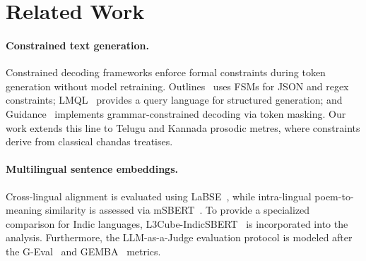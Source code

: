 \documentclass[11pt]{article}
\begin{document}
\section{Related Work}
\label{sec:related}

\paragraph{Constrained text generation.}
Constrained decoding frameworks enforce formal constraints during token
generation without model retraining. Outlines~\citep{willard2023efficient}
uses FSMs for JSON and regex constraints; LMQL~\citep{beurer2023prompting}
provides a query language for structured generation; and
Guidance~\citep{guidance} implements grammar-constrained decoding via token
masking. Our work extends this line to Telugu and Kannada prosodic metres, where constraints
derive from classical chandas treatises.

\paragraph{Multilingual sentence embeddings.}
Cross-lingual alignment is evaluated using LaBSE~\citep{feng2022languageagnostic}, while intra-lingual poem-to-meaning similarity is assessed via mSBERT~\citep{reimers2020multilingual}. To provide a specialized comparison for Indic languages, L3Cube-IndicSBERT~\citep{deode2023l3cubeindicsbertsimpleapproachlearning} is incorporated into the analysis. Furthermore, the LLM-as-a-Judge evaluation protocol is modeled after the G-Eval~\citep{liu2023geval} and GEMBA~\citep{kocmi2023gemba} metrics.
\end{document}
